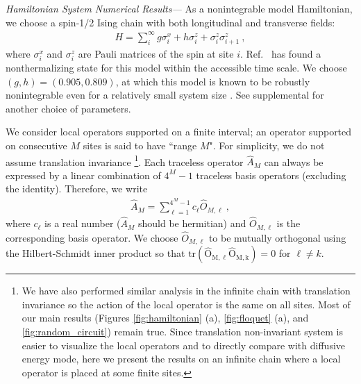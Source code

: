 \documentclass[twocolumn,superscriptaddress, prb]{revtex4-1}
\begin{document}
{\it Hamiltonian System Numerical Results---}
As a nonintegrable model Hamiltonian, we choose a spin-1/2 Ising chain with both longitudinal and transverse fields:
\begin{align}
H = \sum_{i}^{\infty} g\sigma^x_i + h\sigma^z_i + \sigma^z_i \sigma^z_{i+1} ~,
\label{eq:Hamiltonian}
\end{align}
where $\sigma^x_i$ and $\sigma^z_i$ are Pauli matrices of the spin at site $i$.
Ref.~ has found a nonthermalizing state for this model within the accessible time scale.
We choose $(g,h) = (0.905, 0.809)$, at which this model is known to be robustly nonintegrable even for a relatively small system size \cite{Kim:2013}.
See supplemental for another choice of parameters.

We consider local operators supported on a finite interval; an operator supported on consecutive $M$ sites is said to have ``range $M$".
For simplicity, we do not assume translation invariance
\footnote{We have also performed similar analysis in the infinite chain with translation invariance so the action of the local operator is the same on all sites. Most of our main results (Figures \ref{fig:hamiltonian} (a), \ref{fig:floquet} (a), and \ref{fig:random_circuit})
remain true. Since translation non-invariant system is easier to visualize the local operators and to directly compare with diffusive energy mode, here we present the results on an infinite chain where a local operator is placed at some finite sites.}.
Each traceless operator
$\hat{A}_M$ can always be expressed by a linear combination of $4^M - 1$ traceless basis operators (excluding the identity).
Therefore, we write
\begin{align}
\hat{A}_M = \sum_{\ell = 1}^{4^M - 1} c_\ell \hat{O}_{M,\ell} ~,
\end{align}
where $c_\ell$ is a real number ($\hat{A}_M$ should be hermitian) and $\hat{O}_{M,\ell}$ is the corresponding basis operator.
We choose $\hat{O}_{M,\ell}$ to be mutually orthogonal using the Hilbert-Schmidt inner product so that
$\mathrm{tr(\hat{O}_{M,\ell} \hat{O}_{M,k})} = 0$ for $\ell\neq k$.
\end{document}
